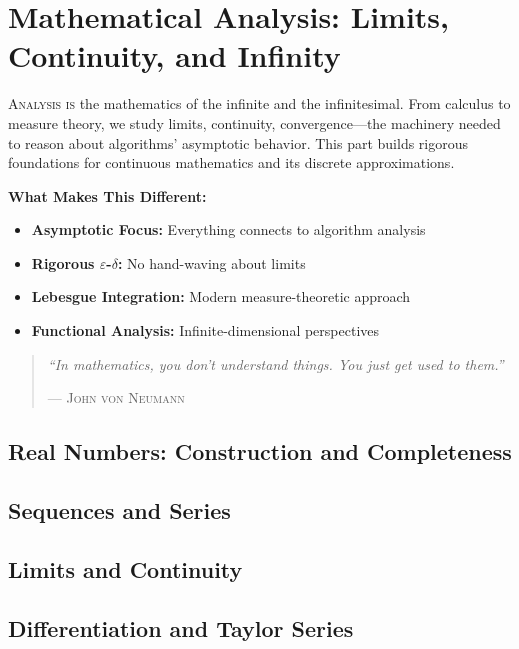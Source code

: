 \part{Mathematical Analysis: Limits, Continuity, and Infinity}
\label{part:analysis}

\begin{partintro}
\lettrine[lines=3]{A}{nalysis is} the mathematics of the infinite and the infinitesimal. From calculus to measure theory, we study limits, continuity, convergence—the machinery needed to reason about algorithms' asymptotic behavior. This part builds rigorous foundations for continuous mathematics and its discrete approximations.

\vspace{1em}
\textbf{What Makes This Different:}
\begin{itemize}[noitemsep]
    \item \textbf{Asymptotic Focus:} Everything connects to algorithm analysis
    \item \textbf{Rigorous $\varepsilon$-$\delta$:} No hand-waving about limits
    \item \textbf{Lebesgue Integration:} Modern measure-theoretic approach
    \item \textbf{Functional Analysis:} Infinite-dimensional perspectives
\end{itemize}

\begin{quote}
\textit{``In mathematics, you don't understand things. You just get used to them.''}

\hfill--- \textsc{John von Neumann}
\end{quote}
\end{partintro}

\chapter{Real Numbers: Construction and Completeness}
\chapter{Sequences and Series}
\chapter{Limits and Continuity}
\chapter{Differentiation and Taylor Series}
